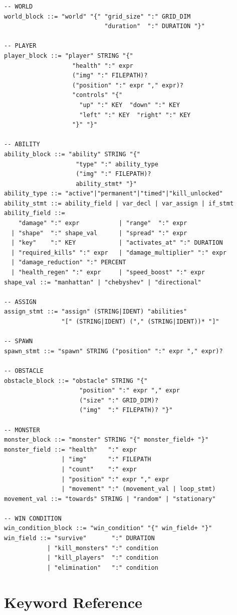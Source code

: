 \documentclass[12pt,a4paper]{article}
\begin{document}
\begin{lstlisting}[style=bnf]
-- WORLD
world_block ::= "world" "{" "grid_size" ":" GRID_DIM
                            "duration"  ":" DURATION "}"

-- PLAYER
player_block ::= "player" STRING "{"
                   "health" ":" expr
                   ("img" ":" FILEPATH)?
                   ("position" ":" expr "," expr)?
                   "controls" "{"
                     "up" ":" KEY  "down" ":" KEY
                     "left" ":" KEY  "right" ":" KEY
                   "}" "}"

-- ABILITY
ability_block ::= "ability" STRING "{"
                    "type" ":" ability_type
                    ("img" ":" FILEPATH)?
                    ability_stmt* "}"
ability_type ::= "active"|"permanent"|"timed"|"kill_unlocked"
ability_stmt ::= ability_field | var_decl | var_assign | if_stmt
ability_field ::=
    "damage" ":" expr           | "range"  ":" expr
  | "shape"  ":" shape_val      | "spread" ":" expr
  | "key"    ":" KEY            | "activates_at" ":" DURATION
  | "required_kills" ":" expr   | "damage_multiplier" ":" expr
  | "damage_reduction" ":" PERCENT
  | "health_regen" ":" expr     | "speed_boost" ":" expr
shape_val ::= "manhattan" | "chebyshev" | "directional"

-- ASSIGN
assign_stmt ::= "assign" (STRING|IDENT) "abilities"
                "[" (STRING|IDENT) ("," (STRING|IDENT))* "]"

-- SPAWN
spawn_stmt ::= "spawn" STRING ("position" ":" expr "," expr)?

-- OBSTACLE
obstacle_block ::= "obstacle" STRING "{"
                     "position" ":" expr "," expr
                     ("size" ":" GRID_DIM)?
                     ("img"  ":" FILEPATH)? "}"

-- MONSTER
monster_block ::= "monster" STRING "{" monster_field+ "}"
monster_field ::= "health"   ":" expr
                | "img"      ":" FILEPATH
                | "count"    ":" expr
                | "position" ":" expr "," expr
                | "movement" ":" (movement_val | loop_stmt)
movement_val ::= "towards" STRING | "random" | "stationary"

-- WIN CONDITION
win_condition_block ::= "win_condition" "{" win_field+ "}"
win_field ::= "survive"       ":" DURATION
            | "kill_monsters" ":" condition
            | "kill_players"  ":" condition
            | "elimination"   ":" condition
\end{lstlisting}

\section{Keyword Reference}
\end{document}
